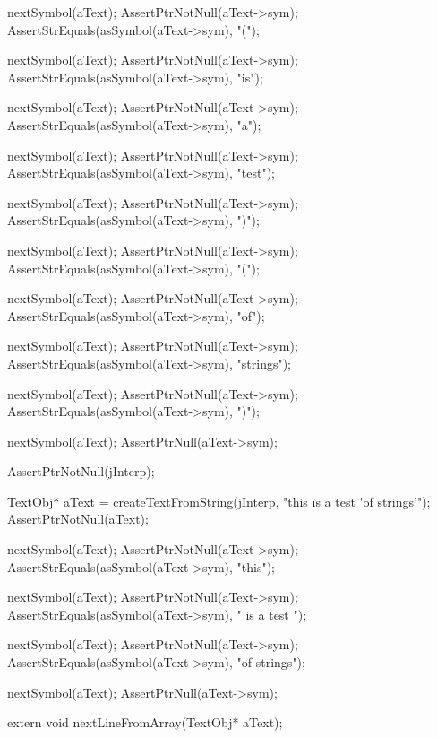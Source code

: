   nextSymbol(aText);
  AssertPtrNotNull(aText->sym);
  AssertStrEquals(asSymbol(aText->sym), "(");

  nextSymbol(aText);
  AssertPtrNotNull(aText->sym);
  AssertStrEquals(asSymbol(aText->sym), "is");

  nextSymbol(aText);
  AssertPtrNotNull(aText->sym);
  AssertStrEquals(asSymbol(aText->sym), "a");

  nextSymbol(aText);
  AssertPtrNotNull(aText->sym);
  AssertStrEquals(asSymbol(aText->sym), "test");

  nextSymbol(aText);
  AssertPtrNotNull(aText->sym);
  AssertStrEquals(asSymbol(aText->sym), ")");

  nextSymbol(aText);
  AssertPtrNotNull(aText->sym);
  AssertStrEquals(asSymbol(aText->sym), "(");

  nextSymbol(aText);
  AssertPtrNotNull(aText->sym);
  AssertStrEquals(asSymbol(aText->sym), "of");

  nextSymbol(aText);
  AssertPtrNotNull(aText->sym);
  AssertStrEquals(asSymbol(aText->sym), "strings");

  nextSymbol(aText);
  AssertPtrNotNull(aText->sym);
  AssertStrEquals(asSymbol(aText->sym), ")");

  nextSymbol(aText);
  AssertPtrNull(aText->sym);
\stopCTest
\stopTestCase

\startCTest
  AssertPtrNotNull(jInterp);

  TextObj* aText =
    createTextFromString(jInterp, "this \" is a test \" 'of strings'");
  AssertPtrNotNull(aText);
  
  nextSymbol(aText);
  AssertPtrNotNull(aText->sym);
  AssertStrEquals(asSymbol(aText->sym), "this");

  nextSymbol(aText);
  AssertPtrNotNull(aText->sym);
  AssertStrEquals(asSymbol(aText->sym), " is a test ");

  nextSymbol(aText);
  AssertPtrNotNull(aText->sym);
  AssertStrEquals(asSymbol(aText->sym), "of strings");

  nextSymbol(aText);
  AssertPtrNull(aText->sym);
\stopCTest
\stopTestCase
\stopTestSuite


\startCHeader
extern void nextLineFromArray(TextObj* aText);
\stopCHeader
{}

